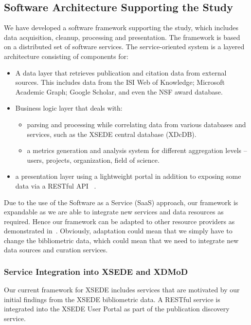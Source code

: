 \documentclass{sig-alternate}
\begin{document}
\subsection{Software Architecture Supporting the Study}

We have developed a software framework supporting the study, which
includes data acquisition, cleanup, processing and presentation. The
framework is based on a distributed set of software services. The
service-oriented system is a layered architecture consisting of
components for:

\begin{itemize}
\item A data layer that retrieves publication and citation data from
  external sources.  This includes data from the ISI Web of Knowledge;
  Microsoft Academic Graph; Google Scholar, and even the NSF award
  database.
\item Business logic layer that deals with:

  \begin{itemize}
  \item parsing and processing while correlating data from various
    databases and services, such as the XSEDE central database
    (XDcDB).
  \item a metrics generation and analysis system for different
    aggregation levels -- users, projects, organization, field of
    science.
  \end{itemize}

\item a presentation layer using a lightweight portal in addition to
  exposing some data via a RESTful API
  ~\cite{Wang:2014:TSI:2616498.2616507}.
\end{itemize}

Due to the use of the Software as a Service (SaaS) approach, our
framework is expandable as we are able to integrate new services and
data resources as required. Hence our framework can be adapted to
other resource providers as demonstrated in~\cite{tas2015}. Obviously,
adaptation could mean that we simply have to change the bibliometric
data, which could mean that we need to integrate new data sources and
curation services.

\subsubsection{Service Integration into XSEDE and XDMoD}

Our current framework for XSEDE includes services that are motivated
by our initial findings from the XSEDE bibliometric data. A RESTful
service is integrated into the XSEDE User Portal as part of the
publication discovery service.
\end{document}
